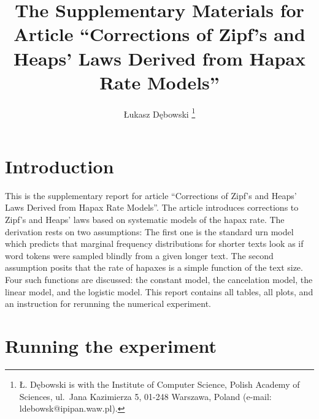 \documentclass[a4paper,12pt]{article}
\title{The Supplementary Materials for Article ``Corrections of Zipf's
  and Heaps' Laws Derived from Hapax Rate Models''}
\author{{\L}ukasz D\k{e}bowski%
  \thanks{{\L}. D\k{e}bowski is with the Institute of Computer
    Science, Polish Academy of Sciences, ul.\ Jana Kazimierza 5,
    01-248 Warszawa, Poland (e-mail: ldebowsk@ipipan.waw.pl).}}
\date{}
\begin{document}
\maketitle


\section{Introduction}
\label{secIntroduction}

This is the supplementary report for article ``Corrections of Zipf's
and Heaps' Laws Derived from Hapax Rate Models''. The article
introduces corrections to Zipf's and Heaps' laws based on systematic
models of the hapax rate. The derivation rests on two assumptions: The
first one is the standard urn model which predicts that marginal
frequency distributions for shorter texts look as if word tokens were
sampled blindly from a given longer text. The second assumption posits
that the rate of hapaxes is a simple function of the text size. Four
such functions are discussed: the constant model, the cancelation model, the
linear model, and the logistic model.  This report contains all
tables, all plots, and an instruction for rerunning the numerical
experiment.

\section{Running the experiment}
\end{document}
